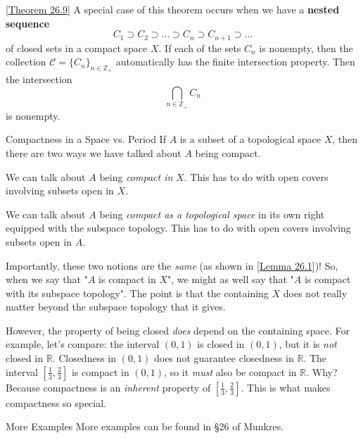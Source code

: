 \begin{remarkBox}{[\hyperlink{thm:26.9}{Theorem 26.9}]}
    A special case of this theorem occurs when we have a \textbf{nested
    sequence}
    \begin{equation*}
        C_{ 1 } \supset C_{ 2 } \supset \ldots \supset 
        C_{ n } \supset C_{ n + 1 } \supset \ldots
    \end{equation*}
    of closed sets in a compact space \( X \).
    If each of the sets \( C_{ n } \) is nonempty, then the collection 
    \( \mathcal{C} = \{ C_{ n } \}_{ n \in \mathbb{Z}_{ + } } \) automatically
    has the finite intersection property.
    Then the intersection
    \begin{equation*}
        \bigcap_{ n \in \mathbb{Z}_{ + } } C_{ n }
    \end{equation*}
    is nonempty.
\end{remarkBox}

\begin{remarkBox}{Compactness in a Space vs. Period}
    If \( A \) is a subset of a topological space \( X \), then there are two
    ways we have talked about \( A \) being compact.

    \baseSkip

    We can talk about \( A \) being \textit{compact in} \( X \).
    This has to do with open covers involving subsets open in \( X \).

    \baseSkip 
    We can talk about \( A \) being \textit{compact as a topological space} in
    its own right equipped with the subspace topology.
    This has to do with open covers involving subsets open in \( A \).

    \baseSkip

    Importantly, these two notions are the \textit{same} (as shown in 
    [\hyperlink{lem:26.1}{Lemma 26.1}])!
    So, when we say that "\( A \) is compact in \( X \)", we might as well say
    that "\( A \) is compact with its subspace topology".
    The point is that the containing \( X \) does not really matter beyond the 
    subspace topology that it gives.

    \baseSkip

    However, the property of being closed \textit{does} depend on the containing
    space. For example, let's compare:
    the interval \( ( 0, 1 ) \) is closed in \( ( 0, 1 ) \), but it is 
    \textit{not} closed in \( \mathbb{R} \).
    Closedness in \( ( 0, 1 ) \) does not guarantee closedness in 
    \( \mathbb{R} \).
    The interval \( [ \frac{ 1 }{ 3 }, \frac{ 2 }{ 3 } ] \) is compact in 
    \( ( 0, 1 ) \), so it \textit{must} also be compact in \( \mathbb{R} \).
    Why? Because compactness is an \textit{inherent} property of 
    \( [ \frac{ 1 }{ 3 }, \frac{ 2 }{ 3 } ] \). 
    This is what makes compactness so special.
\end{remarkBox}

\begin{remarkBox}{More Examples}
    More examples can be found in \S 26 of Munkres.
\end{remarkBox}